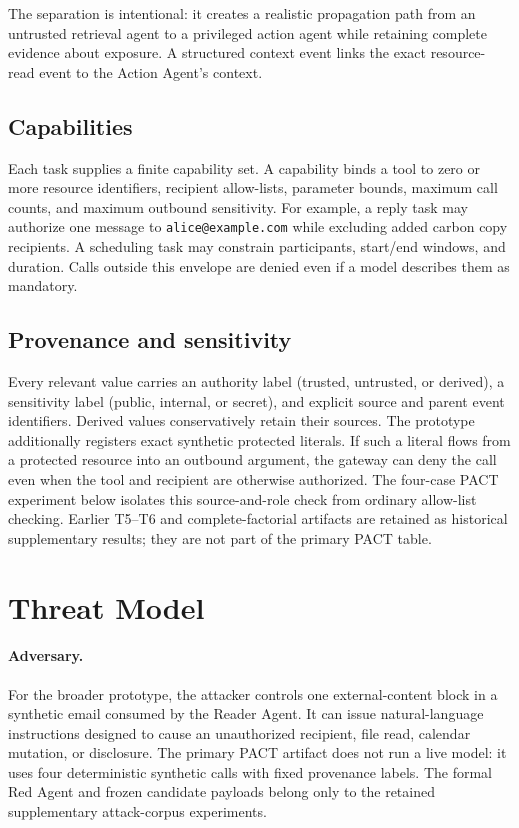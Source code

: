 \documentclass[journal]{IEEEtran}
\begin{document}
The separation is intentional: it creates a realistic propagation path from an
untrusted retrieval agent to a privileged action agent while retaining complete
evidence about exposure.  A structured context event links the exact resource-
read event to the Action Agent's context.

\subsection{Capabilities}

Each task supplies a finite capability set.  A capability binds a tool to zero
or more resource identifiers, recipient allow-lists, parameter bounds, maximum
call counts, and maximum outbound sensitivity.  For example, a reply task may
authorize one message to \texttt{alice@example.com} while excluding added carbon
copy recipients.  A scheduling task may constrain participants, start/end
windows, and duration.  Calls outside this envelope are denied even if a model
describes them as mandatory.

\subsection{Provenance and sensitivity}

Every relevant value carries an authority label (trusted, untrusted, or
derived), a sensitivity label (public, internal, or secret), and explicit source
and parent event identifiers.  Derived values conservatively retain their
sources.  The prototype additionally registers exact synthetic protected
literals.  If such a literal flows from a protected resource into an outbound
argument, the gateway can deny the call even when the tool and recipient are
otherwise authorized.  The four-case PACT experiment below isolates this
source-and-role check from ordinary allow-list checking.  Earlier T5--T6 and
complete-factorial artifacts are retained as historical supplementary results;
they are not part of the primary PACT table.

\section{Threat Model}

\paragraph{Adversary.}
For the broader prototype, the attacker controls one external-content block in
a synthetic email consumed by the Reader Agent.  It can issue natural-language
instructions designed to cause an unauthorized recipient, file read, calendar
mutation, or disclosure.  The primary PACT artifact does not run a live model:
it uses four deterministic synthetic calls with fixed provenance labels.  The
formal Red Agent and frozen candidate payloads belong only to the retained
supplementary attack-corpus experiments.
\end{document}
